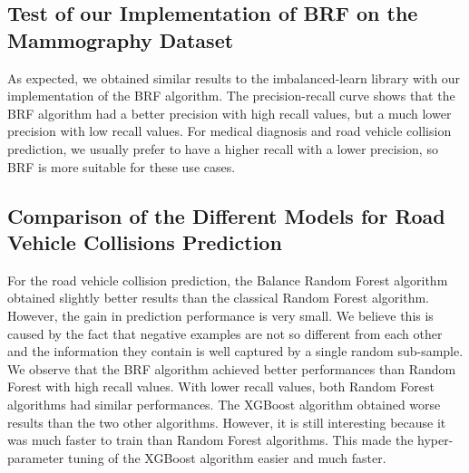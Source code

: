 \documentclass[conference]{IEEEtran}
\begin{document}
\subsection{Test of our Implementation of BRF on the Mammography Dataset}
As expected, we obtained similar results to the imbalanced-learn library with our implementation of the BRF algorithm. The precision-recall curve shows that the BRF algorithm had a better precision with high recall values, but a much lower precision with low recall values. For medical diagnosis and road vehicle collision prediction, we usually prefer to have a higher recall with a lower precision, so BRF is more suitable for these use cases.

\subsection{Comparison of the Different Models for Road Vehicle Collisions Prediction}
For the road vehicle collision prediction, the Balance Random Forest algorithm obtained slightly better results than the classical Random Forest algorithm. However, the gain in prediction performance is very small. 
We believe this is caused by the fact that negative examples are not so different from each other and the information they contain is well captured by a single random sub-sample. We observe that the BRF algorithm achieved better performances than Random Forest with high recall values. With lower recall values, both Random Forest algorithms had similar performances. The XGBoost algorithm obtained worse results than the two other algorithms. However, it is still interesting because it was much faster to train than Random Forest algorithms. This made the hyper-parameter tuning of the XGBoost algorithm easier and much faster.
\end{document}
